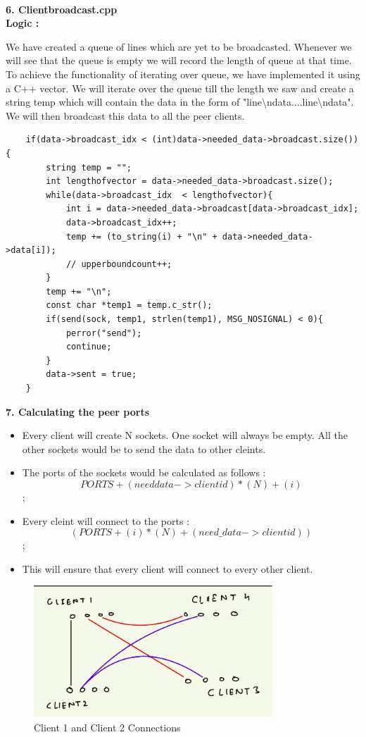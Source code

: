 \documentclass[12pt]{scrartcl}
\begin{document}
\\
\textbf{6. Clientbroadcast.cpp}\\
\textbf{Logic : }
\par We have created a queue of lines which are yet to be broadcasted. Whenever we will see that the queue is empty we will record the length of queue at that time. To achieve the functionality of iterating over queue, we have implemented it using a C++ vector. We will iterate over the queue till the length we saw and create a string temp which will contain the data in the form of "line\textbackslash ndata....line\textbackslash ndata". We will then broadcast this data to all the peer clients.\\
\begin{verbatim}
    if(data->broadcast_idx < (int)data->needed_data->broadcast.size()){
        string temp = "";
        int lengthofvector = data->needed_data->broadcast.size();
        while(data->broadcast_idx  < lengthofvector){
            int i = data->needed_data->broadcast[data->broadcast_idx];
            data->broadcast_idx++;
            temp += (to_string(i) + "\n" + data->needed_data->data[i]);
            // upperboundcount++;
        }
        temp += "\n";
        const char *temp1 = temp.c_str();
        if(send(sock, temp1, strlen(temp1), MSG_NOSIGNAL) < 0){
            perror("send");
            continue;
        }
        data->sent = true;
    }
\end{verbatim}

\textbf{7. Calculating the peer ports}
\begin{itemize}
    \item Every client will create N sockets. One socket will always be empty. All the other sockets would be to send the data to other cleints.
    \item The ports of the sockets would be calculated as follows :$$PORTS + (needdata->clientid) * (N) + (i)$$;
    \item Every cleint will connect to the ports : $$(PORTS + (i) * (N) + (need\_data->clientid))$$;
    \item This will ensure that every client will connect to every other client.
\end{itemize}
\begin{figure}[H]
    \centering
    \includegraphics[width=0.8\textwidth]{images/Screenshot from 2023-09-05 11-44-09.png}
    \caption{Client 1 and Client 2 Connections}
    \label{fig:my_label}
\end{figure}
\end{document}
